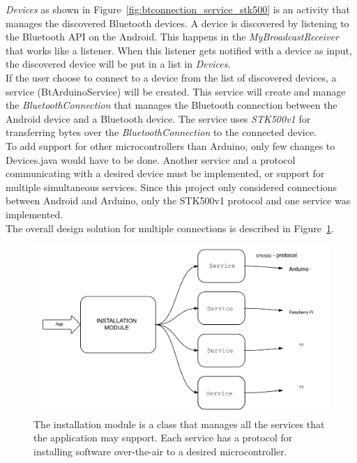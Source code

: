 	\textit{Devices} as shown in Figure~\ref{fig:btconnection_service_stk500} is an activity that manages the discovered Bluetooth devices. A device is discovered by listening to the Bluetooth API on the Android. This happens in the \textit{MyBroadcastReceiver} that works like a listener. When this listener gets notified with a device as input, the discovered device will be put in a list in \textit{Devices}.\\

	If the user choose to connect to a device from the list of discovered devices, a service (BtArduinoService) will be created. This service will create and manage the \textit{BluetoothConnection} that manages the Bluetooth connection between the Android device and a Bluetooth device. The service uses \textit{STK500v1} for transferring bytes over the \textit{BluetoothConnection} to the connected device.\\

	To add support for other microcontrollers than Arduino, only few changes to Devices.java would have to be done. Another service and a protocol communicating with a desired device must be implemented, or support for multiple simultaneous services. Since this project only considered connections between Android and Arduino, only the STK500v1 protocol and one service was implemented.\\

	The overall design solution for multiple connections is described in Figure~\ref{fig:otaarchitecture}.\\
	\begin{figure}[H]
	\includegraphics[scale=0.7]{figures/OTAArchitecture.pdf}
	\caption[Over The Air Architecture]{The installation module is a class that manages all the services that the application may support. Each service has a protocol for installing software over-the-air to a desired microcontroller.}
	\label{fig:otaarchitecture}
	\end{figure}

